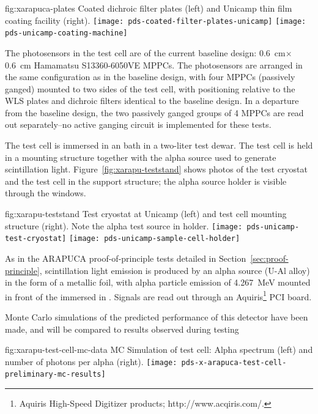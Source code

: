 \begin{dunefigure}{fig:xarapuca-plates}
{Coated dichroic filter plates (left) and Unicamp thin film coating facility (right).} 
	\texttt{[image: pds-coated-filter-plates-unicamp]}\quad
	\texttt{[image: pds-unicamp-coating-machine]}
\end{dunefigure}

The photosensors in the test cell are of the current baseline design:  \SI{0.6}{cm}$\times$\SI{0.6}{cm} Hamamatsu S13360-6050VE MPPCs.  The photosensors are arranged in the same configuration as in the baseline design, with four MPPCs (passively ganged) mounted to two sides of the test cell, with positioning relative to the WLS plates and dichroic filters identical to the baseline design.  In a departure from the baseline design, the two passively ganged groups of 4 MPPCs are read out separately--no active ganging circuit is implemented for these tests.

The test cell is immersed in an  bath in a two-liter test dewar.  The test cell is held in a mounting structure together with the alpha source used to generate scintillation light. Figure~\ref{fig:xarapu-teststand} shows photos of the test cryostat and the test cell in the support structure; the alpha source holder is visible through the windows. 

\begin{dunefigure}{fig:xarapu-teststand}
{Test cryostat at Unicamp (left) and  test cell mounting structure (right).  Note the alpha test source in holder.} 
	\texttt{[image: pds-unicamp-test-cryostat]} \quad
	\texttt{[image: pds-unicamp-sample-cell-holder]}
\end{dunefigure}  

As in the ARAPUCA proof-of-principle tests detailed in Section~\ref{sec:proof-principle}, scintillation light emission is produced by an alpha source (U-Al alloy) in the form of a metallic foil, with alpha particle emission of \SI{4.267}{MeV} mounted in front of the  immersed in \lar. Signals are read out through an Aquiris\footnote{Aquiris High-Speed Digitizer products; http://www.acqiris.com/.} PCI board.

Monte Carlo simulations of the predicted performance of this detector have been made, and will be compared to results observed during testing
\begin{dunefigure}{fig:xarapu-test-cell-mc-data}
{MC Simulation of  test cell: Alpha spectrum (left) and number of photons per alpha (right).} 
	\texttt{[image: pds-x-arapuca-test-cell-preliminary-mc-results]}
    \vspace{-3cm}
\end{dunefigure}


